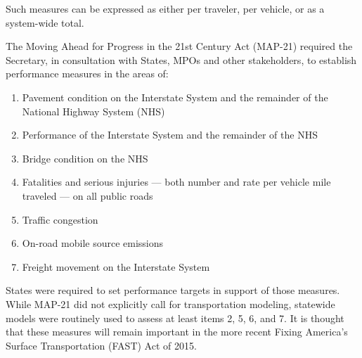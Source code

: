 \noindent Such measures can be expressed as either per traveler, per vehicle, or as a system-wide total.

The Moving Ahead for Progress in the 21st Century Act (MAP-21) required the Secretary, in consultation with States, MPOs and other stakeholders, to establish performance measures in the areas of:

\begin{enumerate}
\item Pavement condition on the Interstate System and the remainder of the National Highway System (NHS)
\item Performance of the Interstate System and the remainder of the NHS
\item Bridge condition on the NHS
\item Fatalities and serious injuries --- both number and rate per vehicle mile traveled --- on all public roads
\item Traffic congestion
\item On-road mobile source emissions
\item Freight movement on the Interstate System
\end{enumerate}

States were required to set performance targets in support of those measures. While MAP-21 did not explicitly call for transportation modeling, statewide models were routinely used to assess at least items 2, 5, 6, and 7. It is thought that these measures will remain important in the more recent Fixing America's Surface Transportation (FAST) Act of 2015.